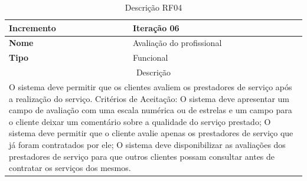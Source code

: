 \begin{table}[htb]
	\centering
	\caption{\label{Formatação do texto.}Descrição RF04}	
	\begin{tabular}{|l|p{11cm}|}
		\hline
		\textbf{Incremento}    & Iteração 06\\ \hline
		\textbf{Nome}    & Avaliação do profissional\\ \hline
		\textbf{Tipo}    & Funcional\\ \hline
		\multicolumn{2}{|c|}{Descrição}\\ \hline
		\multicolumn{2}{|p{12cm}|}{
			O sistema deve permitir que os clientes avaliem os prestadores de serviço após a realização do serviço. \newline
			\newline Critérios de Aceitação: \newline
			O sistema deve apresentar um campo de avaliação com uma escala numérica ou de estrelas e um campo para o cliente deixar um comentário sobre a qualidade do serviço prestado; \newline
			\newline O sistema deve permitir que o cliente avalie apenas os prestadores de serviço que já foram contratados por ele; \newline
			\newline O sistema deve disponibilizar as avaliações dos prestadores de serviço para que outros clientes possam consultar antes de contratar os serviços dos mesmos.
			} \\ \hline
	\end{tabular}
\end{table}

